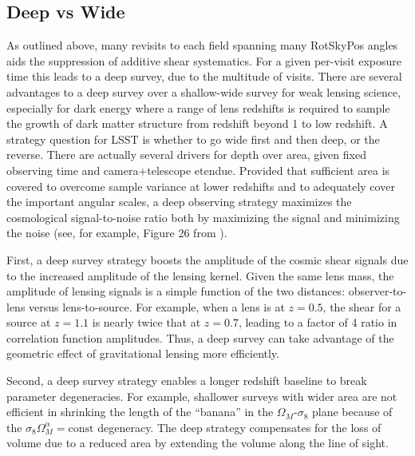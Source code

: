 \subsection{Deep vs Wide}


As outlined above, many revisits to each field spanning many RotSkyPos angles
aids the suppression of additive shear systematics.  For a given per-visit
exposure time this leads to a deep survey, due to the multitude of visits.
There are several advantages to a deep survey over a shallow-wide survey for
weak lensing science, especially for dark energy where a range of lens redshifts
is required to sample the growth of dark matter structure from redshift beyond 1
to low redshift.  A strategy question for LSST is whether to go wide first and
then deep, or the reverse.  There are actually several drivers for depth over
area, given fixed observing time and camera+telescope etendue.  Provided that
sufficient area is covered to overcome sample variance at lower redshifts and to
adequately cover the important angular scales, a deep observing strategy
maximizes the cosmological signal-to-noise ratio both by maximizing the signal
and minimizing the noise (see, for example, Figure 26 from \citep{Jee2013}).

First, a deep survey strategy boosts the amplitude of the cosmic shear signals
due to the increased amplitude of the lensing kernel.  Given the same lens mass,
the amplitude of lensing signals is a simple function of the two distances:
observer-to-lens versus lens-to-source.  For example, when a lens is at $z =
0.5$, the shear for a source at $z = 1.1$ is nearly twice that at $z = 0.7$,
leading to a factor of 4 ratio in correlation function amplitudes.  Thus, a deep
survey can take advantage of the geometric effect of gravitational lensing more
efficiently.

Second, a deep survey strategy enables a longer redshift baseline to break
parameter degeneracies.  For example, shallower surveys with wider area are not
efficient in shrinking the length of the ``banana'' in the $\Omega_M$-$\sigma_8$
plane because of the $\sigma_8 \Omega_M^\alpha = \mathrm{const}$ degeneracy.
The deep strategy compensates for the loss of volume due to a reduced area by
extending the volume along the line of sight.

